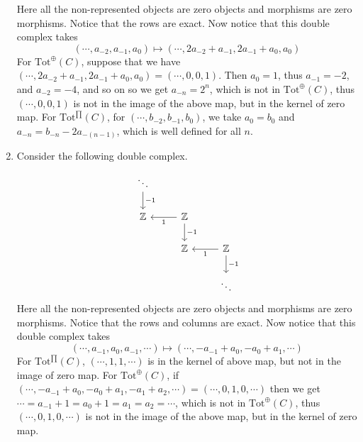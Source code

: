 \begin{exer}
\begin{solution}
\begin{enumerate}
\begin{equation}
\end{equation}
Here all the non-represented objects are zero objects and morphisms are zero morphisms. Notice that the rows are exact. Now notice that this double complex takes
\begin{equation}
(\cdots,a_{-2},a_{-1},a_0)\mapsto (\cdots,2a_{-2}+a_{-1},2a_{-1}+a_{0},a_{0})
\end{equation}
For $\textrm{Tot}^{\oplus}(C)$, suppose that we have $(\cdots,2a_{-2}+a_{-1},2a_{-1}+a_{0},a_0)=(\cdots,0,0,1)$. Then $a_0=1$, thus $a_{-1}=-2$, and $a_{-2}=-4$, and so on so we get $a_{-n}=2^n$, which is not in $\textrm{Tot}^{\oplus}(C)$, thus $(\cdots,0,0,1)$ is not in the image of the above map, but in the kernel of zero map. For $\textrm{Tot}^{\prod}(C)$, for $(\cdots,b_{-2},b_{-1},b_0)$, we take $a_0=b_0$ and $a_{-n}=b_{-n}-2a_{-(n-1)}$, which is well defined for all $n$. 
\item Consider the following double complex.
\begin{equation}
\begin{tikzcd}
\ddots\arrow{d}{-1}& &\\
\mathbb{Z}&\mathbb{Z} \arrow{l}{1} \arrow{d}{-1}&\\
&\mathbb{Z}&\mathbb{Z} \arrow{l}{1}\arrow{d}{-1}\\
&&\ddots
\end{tikzcd}
\end{equation}
Here all the non-represented objects are zero objects and morphisms are zero morphisms. Notice that the rows and columns are exact. Now notice that this double complex takes
\begin{equation}
(\cdots,a_{-1},a_0,a_{-1},\cdots)\mapsto (\cdots,-a_{-1}+a_0,-a_0+a_1,\cdots)
\end{equation}
For $\textrm{Tot}^{\prod}(C)$, $(\cdots,1,1,\cdots)$ is in the kernel of above map, but not in the image of zero map. For $\textrm{Tot}^{\oplus}(C)$, if $(\cdots,-a_{-1}+a_0,-a_0+a_1,-a_1+a_2,\cdots)=(\cdots,0,1,0,\cdots)$ then we get $\cdots=a_{-1}+1=a_0+1=a_1=a_2=\cdots$, which is not in $\textrm{Tot}^{\oplus}(C)$, thus $(\cdots,0,1,0,\cdots)$ is not in the image of the above map, but in the kernel of zero map.
\end{enumerate}
\end{solution}
\end{exer}

